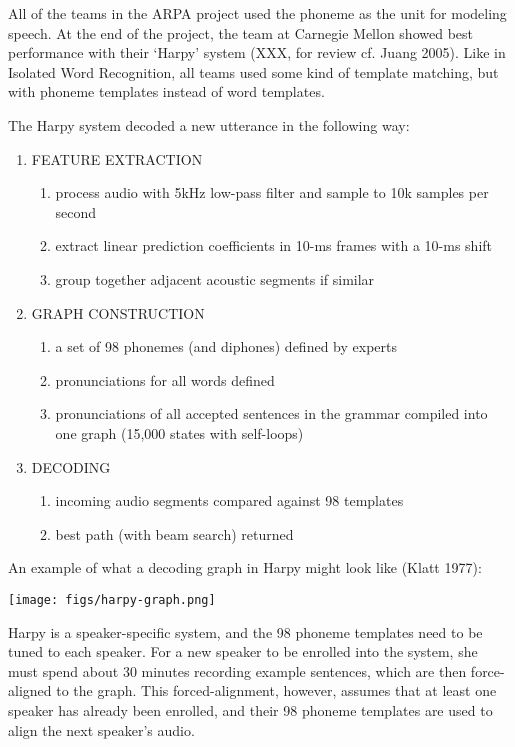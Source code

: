 \documentclass[10pt,a4paper]{article}
\begin{document}
All of the teams in the ARPA project used the phoneme as the unit for modeling speech. At the end of the project, the team at Carnegie Mellon showed best performance with their `Harpy' system (XXX, for review cf. Juang 2005). Like in Isolated Word Recognition, all teams used some kind of template matching, but with phoneme templates instead of word templates.

The Harpy system decoded a new utterance in the following way:

\begin{enumerate}
\item FEATURE EXTRACTION
  \begin{enumerate}
  \item process audio with 5kHz low-pass filter and sample to 10k samples per second 
  \item extract linear prediction coefficients in 10-ms frames with a 10-ms shift
  \item group together adjacent acoustic segments if similar
  \end{enumerate}
  
\item GRAPH CONSTRUCTION
  \begin{enumerate}
  \item a set of 98 phonemes (and diphones) defined by experts
  \item pronunciations for all words defined
  \item pronunciations of all accepted sentences in the grammar compiled into one graph (15,000 states with self-loops)
  \end{enumerate}

\item DECODING
  \begin{enumerate}
  \item incoming audio segments compared against 98 templates
  \item best path (with beam search) returned
  \end{enumerate}
\end{enumerate}

An example of what a decoding graph in Harpy might look like (Klatt 1977):


\begin{center}
\texttt{[image: figs/harpy-graph.png]}
\end{center}


Harpy is a speaker-specific system, and the 98 phoneme templates need to be tuned to each speaker. For a new speaker to be enrolled into the system, she must spend about 30 minutes recording example sentences, which are then force-aligned to the graph. This forced-alignment, however, assumes that at least one speaker has already been enrolled, and their 98 phoneme templates are used to align the next speaker's audio.
\end{document}
